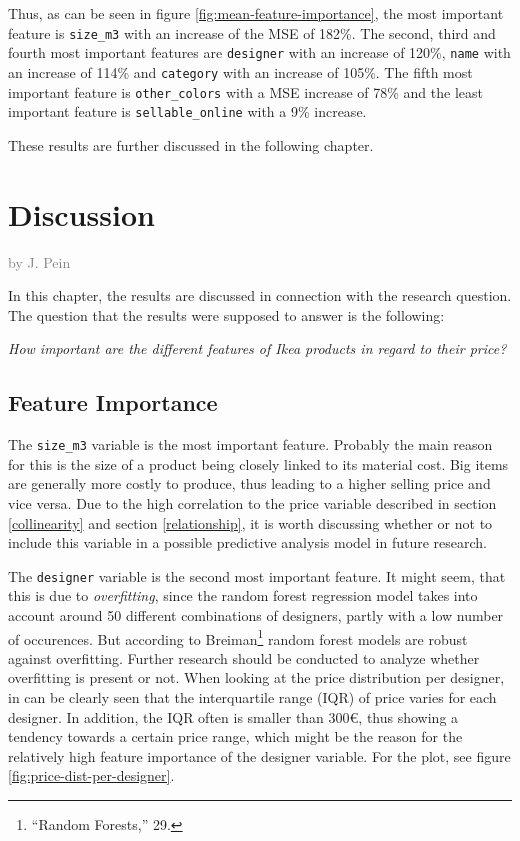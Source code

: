 \documentclass[a4paper, nobind]{templates/ociamthesis}
\begin{document}
Thus, as can be seen in figure \ref{fig:mean-feature-importance}, the most important feature is \texttt{size\_m3} with an increase of the MSE of 182\%. The second, third and fourth most important features are \texttt{designer} with an increase of 120\%, \texttt{name} with an increase of 114\% and \texttt{category} with an increase of 105\%. The fifth most important feature is \texttt{other\_colors} with a MSE increase of 78\% and the least important feature is \texttt{sellable\_online} with a 9\% increase.

These results are further discussed in the following chapter.

\hypertarget{discussion}{%
\chapter{Discussion}\label{discussion}}

\hfill\textcolor{gray}{by J. Pein}

In this chapter, the results are discussed in connection with the research question. The question that the results were supposed to answer is the following:

\emph{How important are the different features of Ikea products in regard to their price?}

\hypertarget{feature-importance-1}{%
\section{Feature Importance}\label{feature-importance-1}}

The \texttt{size\_m3} variable is the most important feature. Probably the main reason for this is the size of a product being closely linked to its material cost. Big items are generally more costly to produce, thus leading to a higher selling price and vice versa. Due to the high correlation to the price variable described in section \ref{collinearity} and section \ref{relationship}, it is worth discussing whether or not to include this variable in a possible predictive analysis model in future research.

The \texttt{designer} variable is the second most important feature. It might seem, that this is due to \emph{overfitting}, since the random forest regression model takes into account around 50 different combinations of designers, partly with a low number of occurences. But according to Breiman\footnote{``Random Forests,'' 29.} random forest models are robust against overfitting. Further research should be conducted to analyze whether overfitting is present or not.
When looking at the price distribution per designer, in can be clearly seen that the interquartile range (IQR) of price varies for each designer. In addition, the IQR often is smaller than 300€, thus showing a tendency towards a certain price range, which might be the reason for the relatively high feature importance of the designer variable. For the plot, see figure \ref{fig:price-dist-per-designer}.
\end{document}
